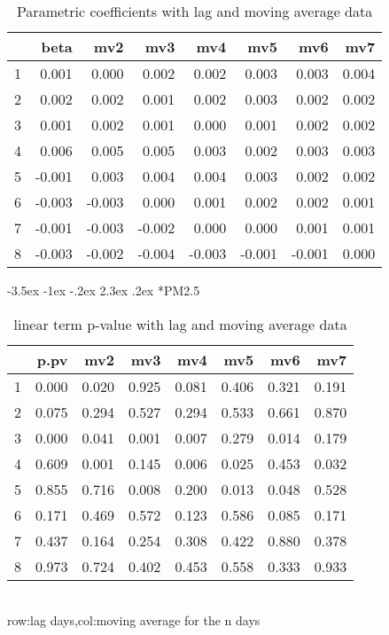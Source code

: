 \documentclass[a4paper, 12pt]{article}
\makeatletter
\def\large{\fontsize{14}{20}\selectfont}
\renewcommand\subsection{\@startsection {subsection}{1}{\z@}%
                                   {-3.5ex \@plus -1ex \@minus -.2ex}%
                                   {2.3ex \@plus.2ex}%
                                   {\centering\normalfont\large\bfseries}}
\makeatother
\begin{document}
\begin{table}[h]
\centering
\caption{Parametric coefficients with lag and moving average data}
\begin{tabular}{rrrrrrrr}
  \hline
 & beta & mv2 & mv3 & mv4 & mv5 & mv6 & mv7 \\
  \hline
1 & 0.001 & 0.000 & 0.002 & 0.002 & 0.003 & 0.003 & 0.004 \\
  2 & 0.002 & 0.002 & 0.001 & 0.002 & 0.003 & 0.002 & 0.002 \\
  3 & 0.001 & 0.002 & 0.001 & 0.000 & 0.001 & 0.002 & 0.002 \\
  4 & 0.006 & 0.005 & 0.005 & 0.003 & 0.002 & 0.003 & 0.003 \\
  5 & -0.001 & 0.003 & 0.004 & 0.004 & 0.003 & 0.002 & 0.002 \\
  6 & -0.003 & -0.003 & 0.000 & 0.001 & 0.002 & 0.002 & 0.001 \\
  7 & -0.001 & -0.003 & -0.002 & 0.000 & 0.000 & 0.001 & 0.001 \\
  8 & -0.003 & -0.002 & -0.004 & -0.003 & -0.001 & -0.001 & 0.000 \\
   \hline
\end{tabular}
\end{table}
\clearpage
\subsection*{PM2.5}
\begin{table}[h]
\centering
\caption{linear term p-value with lag and moving average data}
\begin{tabular}{rrrrrrrr}
  \hline
 & p.pv & mv2 & mv3 & mv4 & mv5 & mv6 & mv7 \\
  \hline
1 & 0.000 & 0.020 & 0.925 & 0.081 & 0.406 & 0.321 & 0.191 \\
  2 & 0.075 & 0.294 & 0.527 & 0.294 & 0.533 & 0.661 & 0.870 \\
  3 & 0.000 & 0.041 & 0.001 & 0.007 & 0.279 & 0.014 & 0.179 \\
  4 & 0.609 & 0.001 & 0.145 & 0.006 & 0.025 & 0.453 & 0.032 \\
  5 & 0.855 & 0.716 & 0.008 & 0.200 & 0.013 & 0.048 & 0.528 \\
  6 & 0.171 & 0.469 & 0.572 & 0.123 & 0.586 & 0.085 & 0.171 \\
  7 & 0.437 & 0.164 & 0.254 & 0.308 & 0.422 & 0.880 & 0.378 \\
  8 & 0.973 & 0.724 & 0.402 & 0.453 & 0.558 & 0.333 & 0.933 \\
   \hline
\end{tabular}
\\row:lag days,col:moving average for the n days
\end{table}
\end{document}
